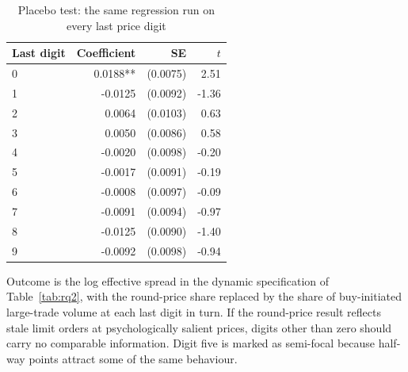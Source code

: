 \begin{table}[htbp]
\centering
\caption{Placebo test: the same regression run on every last price digit}
\label{tab:placebo}
\small
\begin{threeparttable}
\begin{tabular}{@{}lrrr@{}}
\toprule
Last digit & Coefficient & SE & $t$ \\
\midrule
0 & 0.0188** & (0.0075) & 2.51 \\
1 & -0.0125 & (0.0092) & -1.36 \\
2 & 0.0064 & (0.0103) & 0.63 \\
3 & 0.0050 & (0.0086) & 0.58 \\
4 & -0.0020 & (0.0098) & -0.20 \\
5 & -0.0017 & (0.0091) & -0.19 \\
6 & -0.0008 & (0.0097) & -0.09 \\
7 & -0.0091 & (0.0094) & -0.97 \\
8 & -0.0125 & (0.0090) & -1.40 \\
9 & -0.0092 & (0.0098) & -0.94 \\
\bottomrule
\end{tabular}
\begin{tablenotes}[flushleft]\footnotesize
\item Outcome is the log effective spread in the dynamic specification of Table~\ref{tab:rq2}, with the round-price share replaced by the share of buy-initiated large-trade volume at each last digit in turn. If the round-price result reflects stale limit orders at psychologically salient prices, digits other than zero should carry no comparable information. Digit five is marked as semi-focal because half-way points attract some of the same behaviour.
\end{tablenotes}
\end{threeparttable}
\end{table}
